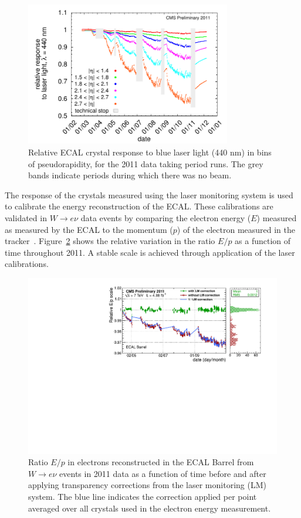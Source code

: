 \begin{figure}
	\centering
	\includegraphics[width=0.8\textwidth]{detector/ecal/laser.pdf}
	\caption{Relative ECAL crystal response to blue laser light (440 nm) in bins of pseudorapidity, 
	for the 2011 data taking period runs. The grey bands indicate periods during which there was no beam.}
	\label{fig:trans}
\end{figure}

The response of the crystals measured using the laser monitoring system is used to calibrate 
the energy reconstruction of the ECAL. These calibrations are validated in $W\rightarrow e\nu$ data events
by comparing the electron energy ($E$) measured as measured by the ECAL to the momentum 
($p$) of the electron measured in the tracker~\citep{CMS-DP-2012-007}. 
Figure~\ref{fig:scaleeop} shows the relative variation in the ratio $E/p$ as a function of time 
throughout 2011. A stable scale is achieved through application of the laser calibrations.

\begin{figure}
	\centering
	\includegraphics[width=\textwidth]{detector/ecal/scaleeop.pdf}
	\caption{Ratio $E/p$ in electrons reconstructed in the ECAL Barrel 
	from $W\rightarrow e\nu$ events in 2011 data as a function of time before 
	and after applying transparency corrections from the laser monitoring (LM) system. 
	The blue line indicates the correction applied per point averaged over all crystals used in the electron
	energy measurement.}
	\label{fig:scaleeop}
\end{figure}

